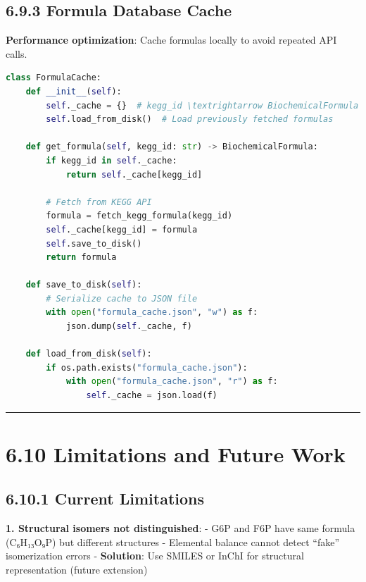 \hypertarget{formula-database-cache}{%
\subsection{6.9.3 Formula Database Cache}\label{formula-database-cache}}

\textbf{Performance optimization}: Cache formulas locally to avoid
repeated API calls.

\begin{lstlisting}[language=Python]
class FormulaCache:
    def __init__(self):
        self._cache = {}  # kegg_id \textrightarrow BiochemicalFormula
        self.load_from_disk()  # Load previously fetched formulas
    
    def get_formula(self, kegg_id: str) -> BiochemicalFormula:
        if kegg_id in self._cache:
            return self._cache[kegg_id]
        
        # Fetch from KEGG API
        formula = fetch_kegg_formula(kegg_id)
        self._cache[kegg_id] = formula
        self.save_to_disk()
        return formula
    
    def save_to_disk(self):
        # Serialize cache to JSON file
        with open("formula_cache.json", "w") as f:
            json.dump(self._cache, f)
    
    def load_from_disk(self):
        if os.path.exists("formula_cache.json"):
            with open("formula_cache.json", "r") as f:
                self._cache = json.load(f)
\end{lstlisting}

\begin{center}\rule{0.5\linewidth}{0.5pt}\end{center}

\hypertarget{limitations-and-future-work}{%
\section{6.10 Limitations and Future
Work}\label{limitations-and-future-work}}

\hypertarget{current-limitations}{%
\subsection{6.10.1 Current Limitations}\label{current-limitations}}

\textbf{1. Structural isomers not distinguished}: - G6P and F6P have
same formula (C₆H₁₃O₉P) but different structures - Elemental balance
cannot detect ``fake'' isomerization errors - \textbf{Solution}: Use
SMILES or InChI for structural representation (future extension)

